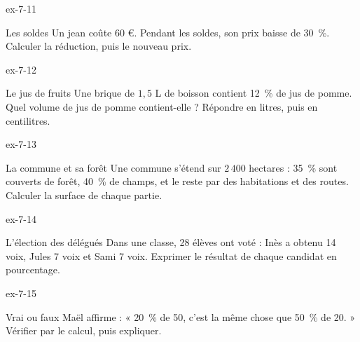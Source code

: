 \begin{blocLivre}{ex-7-11}\begin{exercice}[3]{Les soldes}
Un jean coûte 60 €. Pendant les soldes, son prix baisse de 30~\%. Calculer la réduction, puis le nouveau prix.
\end{exercice}\end{blocLivre}
\begin{blocLivre}{ex-7-12}\begin{exercice}[3]{Le jus de fruits}
Une brique de $1{,}5$ L de boisson contient 12~\% de jus de pomme. Quel volume de jus de pomme contient-elle ? Répondre en litres, puis en centilitres.
\end{exercice}\end{blocLivre}
\begin{blocLivre}{ex-7-13}\begin{exercice}[3]{La commune et sa forêt}
Une commune s’étend sur $2\,400$ hectares : 35~\% sont couverts de forêt, 40~\% de champs, et le reste par des habitations et des routes. Calculer la surface de chaque partie.
\end{exercice}\end{blocLivre}
\begin{blocLivre}{ex-7-14}\begin{exercice}[3]{L’élection des délégués}
Dans une classe, 28 élèves ont voté : Inès a obtenu 14 voix, Jules 7 voix et Sami 7 voix. Exprimer le résultat de chaque candidat en pourcentage.
\end{exercice}\end{blocLivre}
\begin{blocLivre}{ex-7-15}\begin{exercice}[3]{Vrai ou faux}
Maël affirme : « 20~\% de 50, c’est la même chose que 50~\% de 20. » Vérifier par le calcul, puis expliquer.
\end{exercice}\end{blocLivre}

\clearpage
